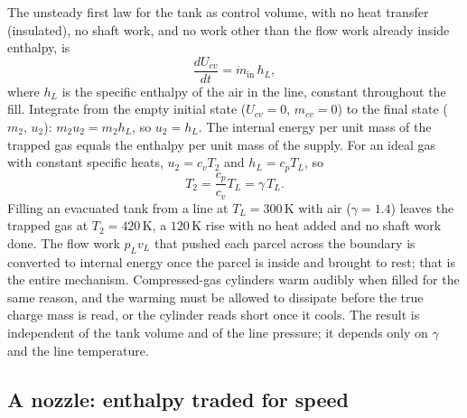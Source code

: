 The unsteady first law for the tank as control volume, with no heat
transfer (insulated), no shaft work, and no work other than the flow
work already inside enthalpy, is
\[
\frac{dU_{cv}}{dt} = \dot{m}_{\text{in}}\, h_L,
\]
where $h_L$ is the specific enthalpy of the air in the line, constant
throughout the fill. Integrate from the empty initial state ($U_{cv} =
0$, $m_{cv} = 0$) to the final state ($m_2$, $u_2$):
$m_2 u_2 = m_2 h_L$, so $u_2 = h_L$. The internal energy per unit mass
of the trapped gas equals the enthalpy per unit mass of the supply. For
an ideal gas with constant specific heats, $u_2 = c_v T_2$ and $h_L =
c_p T_L$, so
\[
T_2 = \frac{c_p}{c_v} T_L = \gamma\, T_L.
\]
Filling an evacuated tank from a line at $T_L = 300\,\si{\kelvin}$ with
air ($\gamma = 1.4$) leaves the trapped gas at $T_2 = 420\,\si{\kelvin}$,
a $120\,\si{\kelvin}$ rise with no heat added and no shaft work done. The
flow work $p_L v_L$ that pushed each parcel across the boundary is
converted to internal energy once the parcel is inside and brought to
rest; that is the entire mechanism. Compressed-gas cylinders warm
audibly when filled for the same reason, and the warming must be allowed
to dissipate before the true charge mass is read, or the cylinder reads
short once it cools. The result is independent of the tank volume and of
the line pressure; it depends only on $\gamma$ and the line temperature.

\subsection{A nozzle: enthalpy traded for speed}

